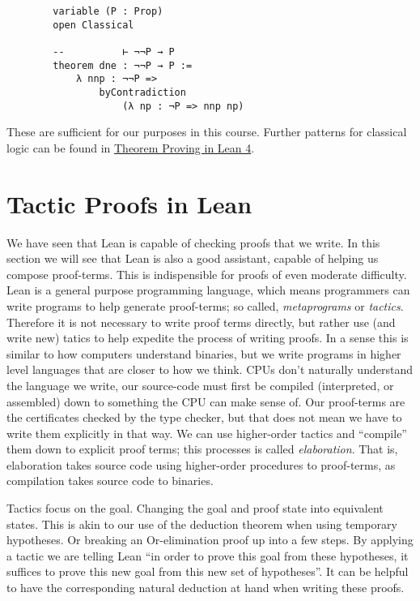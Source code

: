 \documentclass{book}
\begin{document}
    \begin{lstlisting}
        variable (P : Prop)
        open Classical
    
        --          ⊢ ¬¬P → P
        theorem dne : ¬¬P → P :=
            λ nnp : ¬¬P =>
                byContradiction
                    (λ np : ¬P => nnp np)
    \end{lstlisting}

    These are sufficient for our purposes in this course. Further patterns for classical logic can be found in \href{https://lean-lang.org/theorem\_proving\_in\_lean4/axioms\_and\_computation.html}{Theorem Proving in Lean 4}. 

    \newpage
    \section{Tactic Proofs in Lean}


    We have seen that Lean is capable of checking proofs that we write. In this section we will see that Lean is also a good assistant, capable of helping us compose proof-terms. This is indispensible for proofs of even moderate difficulty. Lean is a general purpose programming language, which means programmers can write programs to help generate proof-terms; so called, \emph{metaprograms} or \emph{tactics}. Therefore it is not necessary to write proof terms directly, but rather use (and write new) tatics to help expedite the process of writing proofs. In a sense this is similar to how computers understand binaries, but we write programs in higher level languages that are closer to how we think. CPUs don't naturally understand the language we write, our source-code must first be compiled (interpreted, or assembled) down to something the CPU can make sense of. Our proof-terms are the certificates checked by the type checker, but that does not mean we have to write them explicitly in that way. We can use higher-order tactics and ``compile'' them down to explicit proof terms; this processes is called \emph{elaboration}. That is, elaboration takes source code using higher-order procedures to proof-terms, as compilation takes source code to binaries. 

    Tactics focus on the goal. Changing the goal and proof state into equivalent states. This is akin to our use of the deduction theorem when using temporary hypotheses. Or breaking an Or-elimination proof up into a few steps. By applying a tactic we are telling Lean ``in order to prove this goal from these hypotheses, it suffices to prove this new goal from this new set of hypotheses''. It can be helpful to have the corresponding natural deduction at hand when writing these proofs. 
\end{document}
